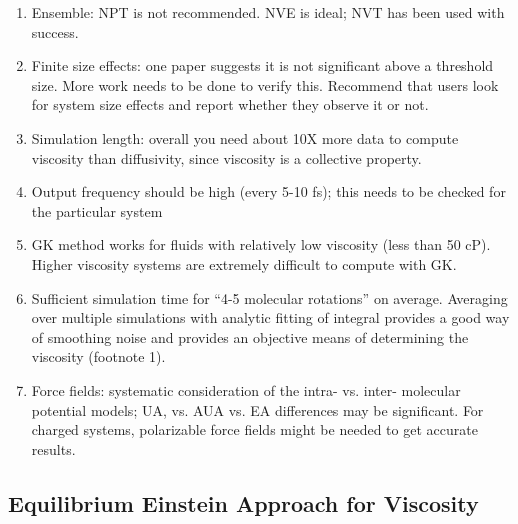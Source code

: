 \documentclass[9pt]{livecoms}
\begin{document}
\begin{enumerate}
	\item Ensemble: NPT is not recommended. NVE is ideal; NVT has been used with success.
	\item Finite size effects: one paper suggests it is not significant above a threshold size. More work needs to be done to verify this. Recommend that users look for system size effects and report whether they observe it or not.
	\item Simulation length: overall you need about 10X more data to compute viscosity than diffusivity, since viscosity is a collective property.
	\item Output frequency should be high (every 5-10 fs); this needs to be checked for the particular system 
	\item GK method works for fluids with relatively low viscosity (less than 50 cP). Higher viscosity systems are extremely difficult to compute with GK.
	\item Sufficient simulation time for “4-5 molecular rotations” on average. Averaging over multiple simulations with analytic fitting of integral provides a good way of smoothing noise and provides an objective means of determining the viscosity (footnote 1).
	\item Force fields: systematic consideration of the intra- vs. inter- molecular potential models; UA, vs. AUA vs. EA differences may be significant. For charged systems, polarizable force fields might be needed to get accurate results.
\end{enumerate}

\subsection{Equilibrium Einstein Approach for Viscosity}
\end{document}
